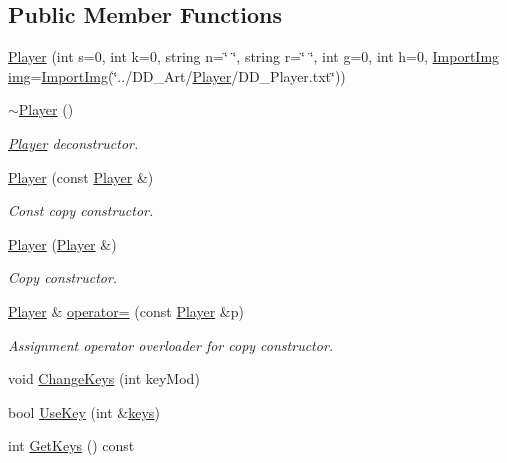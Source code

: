 \subsection*{Public Member Functions}
\begin{DoxyCompactItemize}
\item 
\hyperlink{classPlayer_a36d6f55c7bc6d95cf23d2439b9da19bb}{Player} (int s=0, int k=0, string n=\char`\"{} \char`\"{}, string r=\char`\"{} \char`\"{}, int g=0, int h=0, \hyperlink{classImportImg}{Import\-Img} \hyperlink{classCharacter_a3a0a90b2a43858b259912f659b8e0eea}{img}=\hyperlink{classImportImg}{Import\-Img}(\char`\"{}../D\-D\-\_\-\-Art/\hyperlink{classPlayer}{Player}/D\-D\-\_\-\-Player.\-txt\char`\"{}))
\item 
\hyperlink{classPlayer_a749d2c00e1fe0f5c2746f7505a58c062}{$\sim$\-Player} ()
\begin{DoxyCompactList}\small\item\em \hyperlink{classPlayer}{Player} deconstructor. \end{DoxyCompactList}\item 
\hyperlink{classPlayer_a8826850c4f8a2871819713ef61148836}{Player} (const \hyperlink{classPlayer}{Player} \&)
\begin{DoxyCompactList}\small\item\em Const copy constructor. \end{DoxyCompactList}\item 
\hyperlink{classPlayer_ad2d305f9af724e761a491b7a85a020e0}{Player} (\hyperlink{classPlayer}{Player} \&)
\begin{DoxyCompactList}\small\item\em Copy constructor. \end{DoxyCompactList}\item 
\hyperlink{classPlayer}{Player} \& \hyperlink{classPlayer_a104a89a5228f4d0b87b6e182fc5cb268}{operator=} (const \hyperlink{classPlayer}{Player} \&p)
\begin{DoxyCompactList}\small\item\em Assignment operator overloader for copy constructor. \end{DoxyCompactList}\item 
void \hyperlink{classPlayer_af2f60260add77e68519783dec5400a9f}{Change\-Keys} (int key\-Mod)
\item 
bool \hyperlink{classPlayer_af839bdc1524d571568ea31a34f44f3ab}{Use\-Key} (int \&\hyperlink{classPlayer_ac46baa685ca2a266178f03b9e9877e65}{keys})
\item 
int \hyperlink{classPlayer_a1e9effacf495f5eabdf14a420e03eecd}{Get\-Keys} () const 

\end{DoxyCompactItemize}
